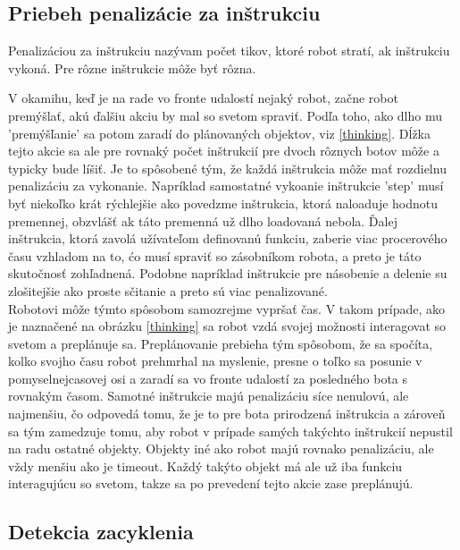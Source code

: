 \subsection{Priebeh penalizácie za inštrukciu}
\begin{definicia}
Penalizáciou za inštrukciu nazývam počet tikov, ktoré robot stratí, ak inštrukciu vykoná. Pre rôzne inštrukcie môže byť rôzna.
\end{definicia}
V okamihu, keď je na rade vo fronte udalostí nejaký robot, začne robot premýšlať, akú ďalšiu akciu by mal so svetom spraviť. Podľa toho, ako dlho mu 'premýšľanie' sa potom zaradí do plánovaných objektov, viz \ref{thinking}. Dĺžka tejto akcie sa ale pre rovnaký počet inštrukcií pre dvoch rôznych botov môže a typicky bude líšiť. Je to spôsobené tým, že každá inštrukcia môže mať rozdielnu penalizáciu za vykonanie. Napríklad samostatné vykoanie inštrukcie 'step' musí byť niekoľko krát rýchlejšie ako povedzme inštrukcia, ktorá naloaduje hodnotu premennej, obzvlášť ak táto premenná už dlho loadovaná nebola. Ďalej inštrukcia, ktorá zavolá užívateľom definovanú funkciu, zaberie viac procerového času vzhladom na to, ćo musí spraviť so zásobníkom robota, a preto je táto skutočnosť zohľadnená. Podobne napríklad inštrukcie pre násobenie a delenie su zlošitejšie ako proste sčitanie a preto sú viac penalizované.\\
\indent
Robotovi môže týmto spôsobom samozrejme vypršať čas. V takom prípade, ako je naznačené na obrázku \ref{thinking} sa robot vzdá svojej možnosti interagovat so svetom a preplánuje sa. Preplánovanie prebieha tým spôsobom, že sa spočíta, kolko svojho času robot prehmrhal na myslenie, presne o toľko sa posunie v pomyselnejcasovej osi a zaradí sa vo fronte udalostí za posledného bota s rovnakým časom. Samotné inštrukcie majú penalizáciu síce nenulovú, ale najmenšiu, čo odpovedá tomu, že je to pre bota prirodzená inštrukcia a zároveň sa tým zamedzuje tomu, aby robot v prípade samých takýchto inštrukcií nepustil na radu ostatné objekty. Objekty iné ako robot majú rovnako penalizáciu, ale vždy menšiu ako je timeout. Každý takýto objekt má ale už iba funkciu interagujúcu so svetom, takze sa po prevedení tejto akcie zase preplánujú.


\subsection{Detekcia zacyklenia}

